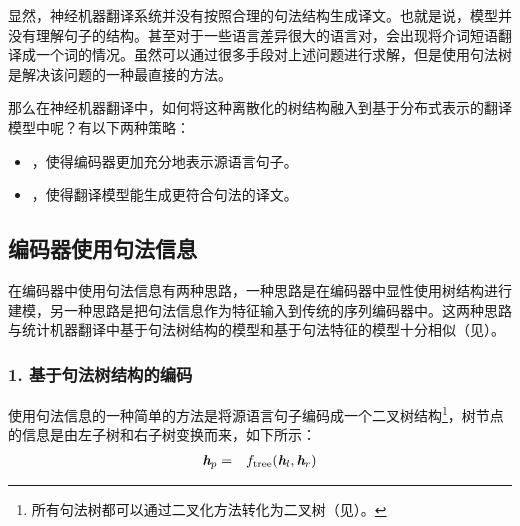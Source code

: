 \parinterval 显然，神经机器翻译系统并没有按照合理的句法结构生成译文。也就是说，模型并没有理解句子的结构。甚至对于一些语言差异很大的语言对，会出现将介词短语翻译成一个词的情况。虽然可以通过很多手段对上述问题进行求解，但是使用句法树是解决该问题的一种最直接的方法。

\parinterval 那么在神经机器翻译中，如何将这种离散化的树结构融入到基于分布式表示的翻译模型中呢？有以下两种策略：

\begin{itemize}
\vspace{0.5em}
\item {\small{}}，使得编码器更加充分地表示源语言句子。
\vspace{0.5em}
\item {\small{}}，使得翻译模型能生成更符合句法的译文。
\vspace{0.5em}
\end{itemize}


\subsection{编码器使用句法信息}

\parinterval 在编码器中使用句法信息有两种思路，一种思路是在编码器中显性使用树结构进行建模，另一种思路是把句法信息作为特征输入到传统的序列编码器中。这两种思路与统计机器翻译中基于句法树结构的模型和基于句法特征的模型十分相似（见{\chaptereight}）。


\subsubsection{1. 基于句法树结构的编码}

\parinterval 使用句法信息的一种简单的方法是将源语言句子编码成一个二叉树结构\footnote[6]{所有句法树都可以通过二叉化方法转化为二叉树（见{\chaptereight}）。}，树节点的信息是由左子树和右子树变换而来，如下所示：
\begin{eqnarray}
\textbf{\em h}_p &=& f_\textrm{tree}(\textbf{\em h}_l,\textbf{\em h}_r)
\label{eq:15-53}
\end{eqnarray}

